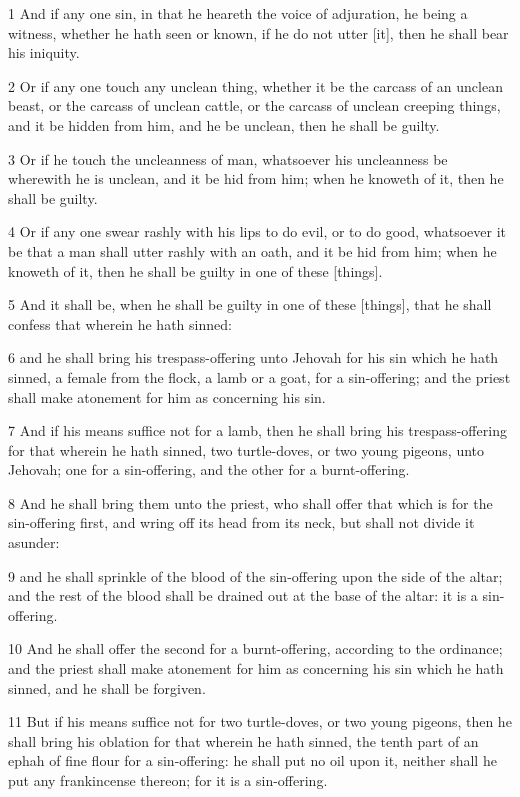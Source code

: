 \par 1 And if any one sin, in that he heareth the voice of adjuration, he being a witness, whether he hath seen or known, if he do not utter [it], then he shall bear his iniquity.
\par 2 Or if any one touch any unclean thing, whether it be the carcass of an unclean beast, or the carcass of unclean cattle, or the carcass of unclean creeping things, and it be hidden from him, and he be unclean, then he shall be guilty.
\par 3 Or if he touch the uncleanness of man, whatsoever his uncleanness be wherewith he is unclean, and it be hid from him; when he knoweth of it, then he shall be guilty.
\par 4 Or if any one swear rashly with his lips to do evil, or to do good, whatsoever it be that a man shall utter rashly with an oath, and it be hid from him; when he knoweth of it, then he shall be guilty in one of these [things].
\par 5 And it shall be, when he shall be guilty in one of these [things], that he shall confess that wherein he hath sinned:
\par 6 and he shall bring his trespass-offering unto Jehovah for his sin which he hath sinned, a female from the flock, a lamb or a goat, for a sin-offering; and the priest shall make atonement for him as concerning his sin.
\par 7 And if his means suffice not for a lamb, then he shall bring his trespass-offering for that wherein he hath sinned, two turtle-doves, or two young pigeons, unto Jehovah; one for a sin-offering, and the other for a burnt-offering.
\par 8 And he shall bring them unto the priest, who shall offer that which is for the sin-offering first, and wring off its head from its neck, but shall not divide it asunder:
\par 9 and he shall sprinkle of the blood of the sin-offering upon the side of the altar; and the rest of the blood shall be drained out at the base of the altar: it is a sin-offering.
\par 10 And he shall offer the second for a burnt-offering, according to the ordinance; and the priest shall make atonement for him as concerning his sin which he hath sinned, and he shall be forgiven.
\par 11 But if his means suffice not for two turtle-doves, or two young pigeons, then he shall bring his oblation for that wherein he hath sinned, the tenth part of an ephah of fine flour for a sin-offering: he shall put no oil upon it, neither shall he put any frankincense thereon; for it is a sin-offering.
